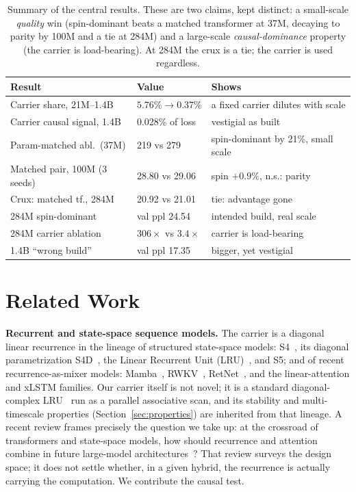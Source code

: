\documentclass[10pt,twocolumn]{article}
\begin{document}
\begin{table}[t]\centering\small\caption{Summary of the central results. These are two claims, kept distinct: a small-scale \emph{quality} win (spin-dominant beats a matched transformer at 37M, decaying to parity by 100M and a tie at 284M) and a large-scale \emph{causal-dominance} property (the carrier is load-bearing). At 284M the crux is a tie; the carrier is used regardless.}
\label{tab:summary}
\begin{tabular}{@{}p{3.6cm} l p{2.6cm}@{}}
\toprule
Result & Value & Shows \\
\midrule
Carrier share, 21M--1.4B & $5.76\% \to 0.37\%$ & a fixed carrier dilutes with scale \\
Carrier causal signal, 1.4B & 0.028\% of loss & vestigial as built \\
Param-matched abl.\ (37M) & 219 vs 279 & spin-dominant by 21\%, small scale \\
Matched pair, 100M (3 seeds) & 28.80 vs 29.06 & spin $+0.9\%$, n.s.: parity \\
Crux: matched tf., 284M & 20.92 vs 21.01 & tie: advantage gone \\
284M spin-dominant & val ppl 24.54 & intended build, real scale \\
284M carrier ablation & $306\times$ vs $3.4\times$ & carrier is load-bearing \\
1.4B ``wrong build'' & val ppl 17.35 & bigger, yet vestigial \\
\bottomrule
\end{tabular}
\end{table}

\section{Related Work}
\textbf{Recurrent and state-space sequence models.} The carrier is a diagonal linear recurrence in the lineage of structured state-space models: S4~\cite{gu2022s4}, its diagonal parametrization S4D~\cite{gu2022s4d}, the Linear Recurrent Unit (LRU)~\cite{orvieto2023lru}, and S5; and of recent recurrence-as-mixer models: Mamba~\cite{gu2023mamba}, RWKV~\cite{peng2023rwkv}, RetNet~\cite{sun2023retnet}, and the linear-attention and xLSTM families. Our carrier itself is not novel; it is a standard diagonal-complex LRU~\cite{orvieto2023lru,gu2022s4d} run as a parallel associative scan, and its stability and multi-timescale properties (Section~\ref{sec:properties}) are inherited from that lineage. A recent review frames precisely the question we take up: at the crossroad of transformers and state-space models, how should recurrence and attention combine in future large-model architectures~\cite{tiezzi2025recurrent}? That review surveys the design space; it does not settle whether, in a given hybrid, the recurrence is actually carrying the computation. We contribute the causal test.
\end{document}
